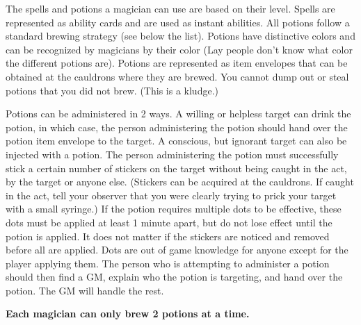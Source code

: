 \documentclass[green]{NeptuneBall}
\begin{document}
\name{\gPotions{}}

The spells and potions a magician can use are based on their level. Spells are represented as ability cards and are used as instant abilities. All potions follow a standard brewing strategy (see below the list). Potions have distinctive colors and can be recognized by magicians by their color (Lay people don't know what color the different potions are). Potions are represented as item envelopes that can be obtained at the cauldrons where they are brewed. You cannot dump out or steal potions that you did not brew. (This is a kludge.)

Potions can be administered in 2 ways. A willing or helpless target can drink the potion, in which case, the person administering the potion should hand over the potion item envelope to the target. A conscious, but ignorant target can also be injected with a potion. The person administering the potion must successfully stick a certain number of stickers on the target without being caught in the act, by the target or anyone else. (Stickers can be acquired at the cauldrons. If caught in the act, tell your observer that you were clearly trying to prick your target with a small syringe.) If the potion requires multiple dots to be effective, these dots must be applied at least 1 minute apart, but do not lose effect until the potion is applied. It does not matter if the stickers are noticed and removed before all are applied. Dots are out of game knowledge for anyone except for the player applying them. The person who is attempting to administer a potion should then find a GM, explain who the potion is targeting, and hand over the potion. The GM will handle the rest.

{\bf Each magician can only brew 2 potions at a time.} %
\end{document}
